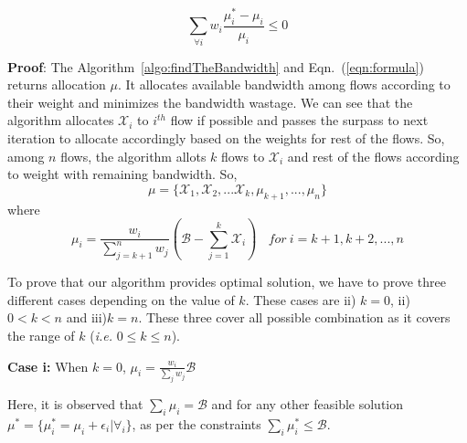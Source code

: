 \begin{equation}
\label{eqn:proofeqn}
\sum_{\forall i} w_i \frac{\mu_i^* - \mu_i}{\mu_i} \le 0
\end{equation}

{\bf Proof}: The Algorithm~\ref{algo:findTheBandwidth} and Eqn.~(\ref{eqn:formula}) returns allocation $\mu$. It allocates available bandwidth among flows according to their weight and minimizes the bandwidth wastage. We can see that the algorithm allocates $\mathcal{X}_i$ to $i^{th}$ flow if possible and passes the surpass to next iteration to allocate accordingly based on the weights for rest of the flows. So, among $n$ flows, the algorithm allots $k$ flows to $\mathcal{X}_i$ and rest of the flows according to weight with remaining bandwidth. So, $$\mu = \{\mathcal{X}_1, \mathcal{X}_2, ... \mathcal{X}_k, \mu_{k+1}, ..., \mu_{n}\}$$ where $$\mu_i = \frac{w_{i}}{\sum_{j=k+1}^{n}w_j}(\mathcal{B} - \sum_{j=1}^{k}\mathcal{X}_i) \ \ \ \ for\ i=k+1,k+2,...,n$$


To prove that our algorithm provides optimal solution, we have to prove three different cases depending on the value of $k$. These cases are ii) $k = 0$, ii) $0 < k < n$ and iii)$k = n$. These three cover all possible combination as it covers the range of $k$ ({\it i.e.} $0 \le k \le n$).

{\bf Case i:} When $k=0$, $\mu_i = \frac{w_i}{\sum_{j}w_j}\mathcal{B}$

Here, it is observed that $\sum_i \mu_i = \mathcal{B}$ and for any other feasible solution $\mu^* = \{\mu_i^* = \mu_i+\epsilon_i | \forall_i\}$, as per the constraints $\sum_i \mu_i^* \le \mathcal{B}$.



